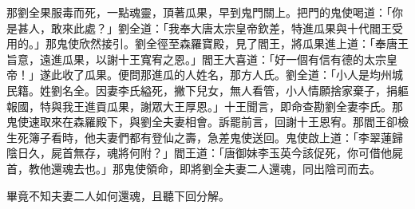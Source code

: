 那劉全果服毒而死，一點魂靈，頂著瓜果，早到鬼門關上。把門的鬼使喝道：「你是甚人，敢來此處？」劉全道：「我奉大唐太宗皇帝欽差，特進瓜果與十代閻王受用的。」那鬼使欣然接引。劉全徑至森羅寶殿，見了閻王，將瓜果進上道：「奉唐王旨意，遠進瓜果，以謝十王寬宥之恩。」閻王大喜道：「好一個有信有德的太宗皇帝！」遂此收了瓜果。便問那進瓜的人姓名，那方人氏。劉全道：「小人是均州城民籍。姓劉名全。因妻李氏縊死，撇下兒女，無人看管，小人情願捨家棄子，捐軀報國，特與我王進貢瓜果，謝眾大王厚恩。」十王聞言，即命查勘劉全妻李氏。那鬼使速取來在森羅殿下，與劉全夫妻相會。訴罷前言，回謝十王恩宥。那閻王卻檢生死簿子看時，他夫妻們都有登仙之壽，急差鬼使送回。鬼使啟上道：「李翠蓮歸陰日久，屍首無存，魂將何附？」閻王道：「唐御妹李玉英今該促死，你可借他屍首，教他還魂去也。」那鬼使領命，即將劉全夫妻二人還魂，同出陰司而去。

畢竟不知夫妻二人如何還魂，且聽下回分解。
